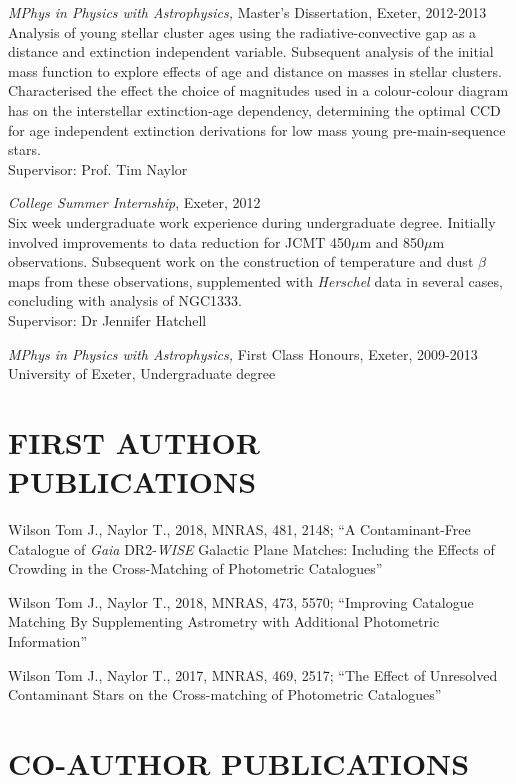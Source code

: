 \documentclass[letter, margin, 10pt]{res} %
\begin{document}
\begin{resume}
{\sl MPhys in Physics with Astrophysics,} Master's Dissertation, Exeter, 2012-2013 \\
Analysis of young stellar cluster ages using the radiative-convective gap as a distance and extinction independent variable. Subsequent analysis of the initial mass function to explore effects of age and distance on masses in stellar clusters. Characterised the effect the choice of magnitudes used in a colour-colour diagram has on the interstellar extinction-age dependency, determining the optimal CCD for age independent extinction derivations for low mass young pre-main-sequence stars. \\Supervisor: Prof. Tim Naylor

{\sl College Summer Internship}, Exeter, 2012\\
Six week undergraduate work experience during undergraduate degree. Initially involved improvements to data reduction for JCMT 450$\mu$m and 850$\mu$m observations. Subsequent work on the construction of temperature and dust $\beta$ maps from these observations, supplemented with \textit{Herschel} data in several cases, concluding with analysis of NGC1333.\\Supervisor: Dr Jennifer Hatchell

{\sl MPhys in Physics with Astrophysics,} First Class Honours, Exeter, 2009-2013 \\
University of Exeter, Undergraduate degree

\parskip 5pt
\section{FIRST AUTHOR PUBLICATIONS}

Wilson Tom J., Naylor T., 2018, MNRAS, 481, 2148; ``A Contaminant-Free Catalogue of \textit{Gaia} DR2-\textit{WISE} Galactic Plane Matches: Including the Effects of Crowding in the Cross-Matching of Photometric Catalogues''

Wilson Tom J., Naylor T., 2018, MNRAS, 473, 5570; ``Improving Catalogue Matching By Supplementing Astrometry with Additional Photometric Information''

Wilson Tom J., Naylor T., 2017, MNRAS, 469, 2517; ``The Effect of Unresolved Contaminant Stars on the Cross-matching of Photometric Catalogues''

\section{CO-AUTHOR PUBLICATIONS}
  

\end{resume}
\end{document}

